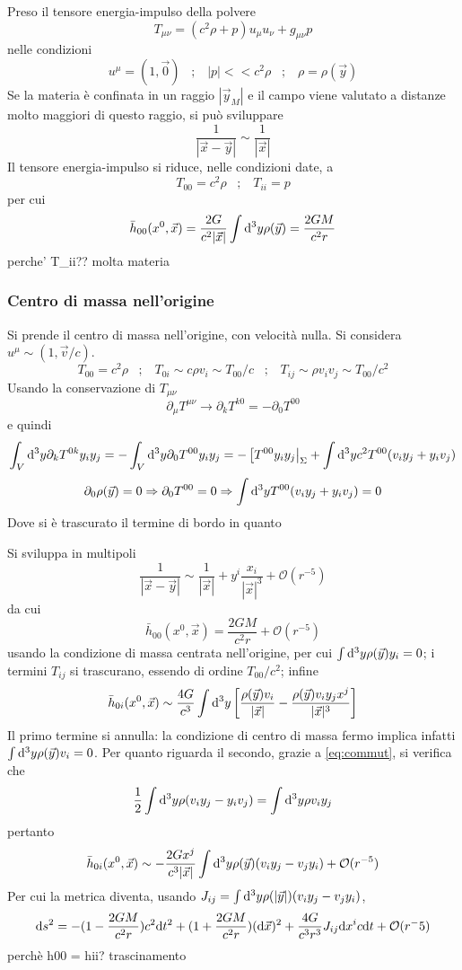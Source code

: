 Preso il tensore energia-impulso della polvere
\[ T_{\mu\nu} = (c^2 \rho +p)u_\mu u_\nu + g_{\mu\nu} p \]
nelle condizioni 
\[ u^\mu = (1,\vec{0}) \;\;\; ; \;\;\; |p| << c^2\rho \;\;\; ; \;\;\; \rho = \rho(\vec{y}) \]
Se la materia \`e confinata in un raggio $|\vec{y}_M|$ e il campo viene valutato a distanze molto maggiori di questo raggio, si pu\`o sviluppare
\[ \frac{1}{|\vec{x}-\vec{y}|} \sim \frac{1}{|\vec{x}|} \]
Il tensore energia-impulso si riduce, nelle condizioni date, a 
\[ T_{00} = c^2\rho \;\;\; ; \;\;\; T_{ii} = p \]
per cui
\[ \bar{h}_{00} (x^0,\vec{x}) = \frac{2G}{c^2 |\vec{x}|} \int \mathrm{d}^3y\rho(\vec{y}) = \frac{2GM}{c^2 r} \]
\todo perche' T\_ii??
\todo molta materia


\subsubsection{Centro di massa nell'origine}
Si prende il centro di massa nell'origine, con velocit\`a nulla. Si considera \( u^\mu \sim (1,\vec{v}/c) \).
\[ T_{00} = c^2\rho \;\;\; ; \;\;\; T_{0i} \sim c\rho v_i \sim T_{00}/c \;\;\; ; \;\;\; T_{ij} \sim \rho v_i v_j\sim T_{00}/c^2 \]
Usando la conservazione di $T_{\mu\nu}$
\[ \partial_\mu T^{\mu\nu} \rightarrow \partial_k T^{k0} = - \partial_0 T^{00} \]
e quindi 
\[ \int_V \mathrm{d}^3y \partial_kT^{0k} y_iy_j = -\int_V \mathrm{d}^3y \partial_0T^{00} y_iy_j  = -\left[ T^{00}y_iy_j\right|_\Sigma + \int \mathrm{d}^3y c^2 T^{00} (v_iy_j + y_iv_j) \]
\begin{equation} \label{eq:commut}
	\partial_0\rho(\vec{y}) = 0 \Rightarrow \partial_0T^{00} = 0 \Rightarrow \int \mathrm{d}^3y T^{00} (v_iy_j + y_iv_j) =0 
\end{equation}
Dove si \`e trascurato il termine di bordo in quanto \todo

Si sviluppa in multipoli
\[ \frac{1}{|\vec{x}-\vec{y}|} \sim \frac{1}{|\vec{x}|} + y^i \frac{x_i}{|\vec{x}|^3} + \mathcal{O}(r^{-5}) \]
da cui
\[ \bar{h}_{00}(x^0,\vec{x}) = \frac{2GM}{c^2 r} + \mathcal{O}(r^{-5}) \]
usando la condizione di massa centrata nell'origine, per cui \( \int \mathrm{d}^3y\rho(\vec{y})y_i = 0\); i termini $T_{ij}$ si trascurano, essendo di ordine $T_{00}/c^2$; infine
\[ \bar{h}_{0i}(x^0,\vec{x}) \sim \frac{4G}{c^3} \int \mathrm{d}^3y 
	\left[ 
		\frac{\rho(\vec{y})v_i}{|\vec{x}|}     
	      - \frac{\rho(\vec{y})v_iy_j x^j}{|\vec{x}|^3} 
	\right] \] 
Il primo termine si annulla: la condizione di centro di massa fermo implica infatti \( \int \mathrm{d}^3y\rho(\vec{y})v_i = 0\). Per quanto riguarda il secondo, grazie a \ref{eq:commut}, si verifica che
\[ \frac{1}{2} \int \mathrm{d}^3y \rho (v_iy_j - y_iv_j) = \int \mathrm{d}^3y \rho v_iy_j \]
pertanto
\[ \bar{h}_{0i}(x^0,\vec{x}) \sim -\frac{2Gx^j}{c^3|\vec{x}|} \int \mathrm{d}^3y \rho(\vec{y}) (v_iy_j - v_jy_i) + \mathcal{O}(r^{-5})  \]
Per cui la metrica diventa, usando \( J_{ij} = \int \mathrm{d}^3y \rho(|\vec{y}|) (v_iy_j - v_jy_i) \),
\[ \mathrm{d} s^2 = -(1 - \frac{2GM}{c^2 r} ) c^2 \mathrm{d} t^2 + (1+\frac{2GM}{c^2 r} ) (\mathrm{d}\vec{x})^2 + \frac{4G}{c^3r^3}J_{ij}\mathrm{d} x^i c \mathrm{d} t + \mathcal{O}(r^-5) \]
\todo perch\`e h00 = hii? 
\todo trascinamento

